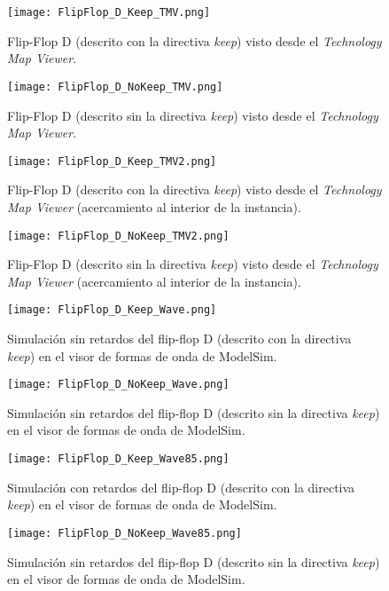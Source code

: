 \begin{figure}[ht]
	\centering
	\texttt{[image: FlipFlop\_D\_Keep\_TMV.png]}
	\caption{Flip-Flop D (descrito con la directiva \textit{keep}) visto desde el \textit{Technology Map Viewer}. \label{fig:FlipFlop_D_Keep_TMV}}
\end{figure}

\begin{figure}[ht]
	\centering
	\texttt{[image: FlipFlop\_D\_NoKeep\_TMV.png]}
	\caption{Flip-Flop D (descrito sin la directiva \textit{keep}) visto desde el \textit{Technology Map Viewer}. \label{fig:FlipFlop_D_NoKeep_TMV}}
\end{figure}

\begin{figure}[ht]
	\centering
	\texttt{[image: FlipFlop\_D\_Keep\_TMV2.png]}
	\caption{Flip-Flop D (descrito con la directiva \textit{keep}) visto desde el \textit{Technology Map Viewer} (acercamiento al interior de la instancia). \label{fig:FlipFlop_D_Keep_TMV2}}
\end{figure}

\begin{figure}[ht]
	\centering
	\texttt{[image: FlipFlop\_D\_NoKeep\_TMV2.png]}
	\caption{Flip-Flop D (descrito sin la directiva \textit{keep}) visto desde el \textit{Technology Map Viewer} (acercamiento al interior de la instancia). \label{fig:FlipFlop_D_NoKeep_TMV2}}
\end{figure}

\begin{figure}[ht]
	\centering
	\texttt{[image: FlipFlop\_D\_Keep\_Wave.png]}
	\caption{Simulación sin retardos del flip-flop D (descrito con la directiva \textit{keep}) en el visor de formas de onda de ModelSim. \label{fig:FlipFlop_D_Keep_Wave}}
\end{figure}

\begin{figure}[ht]
	\centering
	\texttt{[image: FlipFlop\_D\_NoKeep\_Wave.png]}
	\caption{Simulación sin retardos del flip-flop D (descrito sin la directiva \textit{keep}) en el visor de formas de onda de ModelSim. \label{fig:FlipFlop_D_NoKeep_Wave}}
\end{figure}

\begin{figure}[ht]
	\centering
	\texttt{[image: FlipFlop\_D\_Keep\_Wave85.png]}
	\caption{Simulación con retardos del flip-flop D (descrito con la directiva \textit{keep}) en el visor de formas de onda de ModelSim. \label{fig:FlipFlop_D_Keep_Wave85}}
\end{figure}

\begin{figure}[ht]
	\centering
	\texttt{[image: FlipFlop\_D\_NoKeep\_Wave85.png]}
	\caption{Simulación sin retardos del flip-flop D (descrito sin la directiva \textit{keep}) en el visor de formas de onda de ModelSim. \label{fig:FlipFlop_D_NoKeep_Wave85}}
\end{figure}